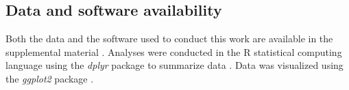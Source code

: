 


\subsection{Data and software availability}

Both the data and the software used to conduct this work are available in the supplemental material \citep{anonymousalifer_2023_7731472}.
Analyses were conducted in the R statistical computing language \citep{r_core_team_r_v4} using the \textit{dplyr} package to summarize data \citep{wickhamDplyrGrammarData2022}.
Data was visualized using the \textit{ggplot2} package \citep{R-ggplot2}.